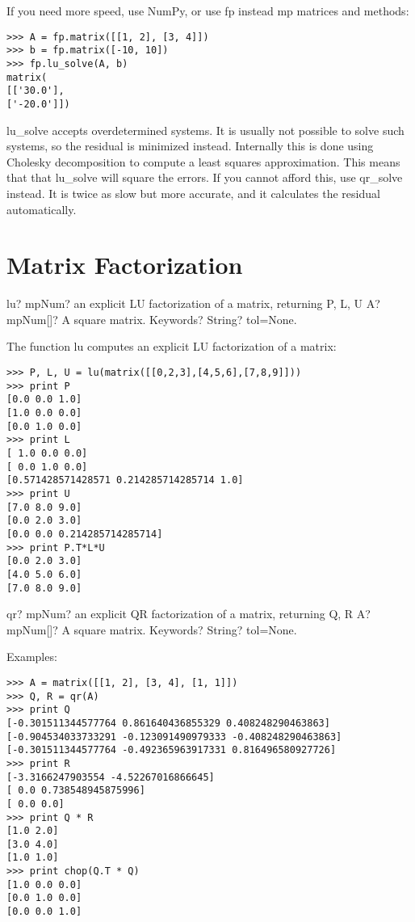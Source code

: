 If you need more speed, use NumPy, or use fp instead mp matrices and methods:

\begin{lstlisting}
>>> A = fp.matrix([[1, 2], [3, 4]])
>>> b = fp.matrix([-10, 10])
>>> fp.lu_solve(A, b)
matrix(
[['30.0'],
['-20.0']])
\end{lstlisting}

lu\_solve accepts overdetermined systems. It is usually not possible to solve such systems, so the residual is minimized instead. Internally this is done using Cholesky decomposition to compute a least squares approximation. This means that that lu\_solve will square the errors. If you cannot afford this, use qr\_solve instead. It is twice as slow but more accurate, and it calculates the residual automatically.



\newpage
\section{Matrix Factorization}

\begin{mpFunctionsExtract}
	\mpFunctionTwo
	{lu? mpNum? an explicit LU factorization of a matrix, returning P, L, U}
	{A? mpNum[]? A square matrix.}
	{Keywords? String?  tol=None.}
\end{mpFunctionsExtract}


The function lu computes an explicit LU factorization of a matrix:

\begin{lstlisting}
>>> P, L, U = lu(matrix([[0,2,3],[4,5,6],[7,8,9]]))
>>> print P
[0.0 0.0 1.0]
[1.0 0.0 0.0]
[0.0 1.0 0.0]
>>> print L
[ 1.0 0.0 0.0]
[ 0.0 1.0 0.0]
[0.571428571428571 0.214285714285714 1.0]
>>> print U
[7.0 8.0 9.0]
[0.0 2.0 3.0]
[0.0 0.0 0.214285714285714]
>>> print P.T*L*U
[0.0 2.0 3.0]
[4.0 5.0 6.0]
[7.0 8.0 9.0]
\end{lstlisting}




\begin{mpFunctionsExtract}
	\mpFunctionTwo
	{qr? mpNum? an explicit QR factorization of a matrix, returning Q, R}
	{A? mpNum[]? A square matrix.}
	{Keywords? String?  tol=None.}
\end{mpFunctionsExtract}

\vpara
Examples:

\begin{lstlisting}
>>> A = matrix([[1, 2], [3, 4], [1, 1]])
>>> Q, R = qr(A)
>>> print Q
[-0.301511344577764 0.861640436855329 0.408248290463863]
[-0.904534033733291 -0.123091490979333 -0.408248290463863]
[-0.301511344577764 -0.492365963917331 0.816496580927726]
>>> print R
[-3.3166247903554 -4.52267016866645]
[ 0.0 0.738548945875996]
[ 0.0 0.0]
>>> print Q * R
[1.0 2.0]
[3.0 4.0]
[1.0 1.0]
>>> print chop(Q.T * Q)
[1.0 0.0 0.0]
[0.0 1.0 0.0]
[0.0 0.0 1.0]
\end{lstlisting}





